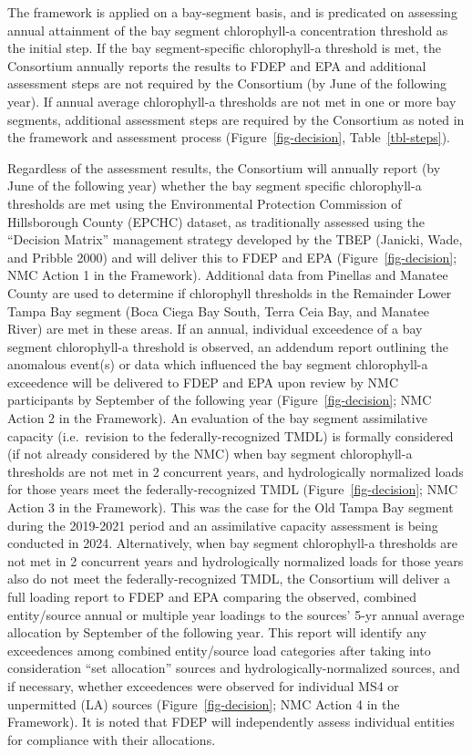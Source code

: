 \documentclass[
  letterpaper,
  DIV=11,
  numbers=noendperiod]{scrreport}
\begin{document}
The framework is applied on a bay-segment basis, and is predicated on
assessing annual attainment of the bay segment chlorophyll-a
concentration threshold as the initial step. If the bay segment-specific
chlorophyll-a threshold is met, the Consortium annually reports the
results to FDEP and EPA and additional assessment steps are not required
by the Consortium (by June of the following year). If annual average
chlorophyll-a thresholds are not met in one or more bay segments,
additional assessment steps are required by the Consortium as noted in
the framework and assessment process (Figure~\ref{fig-decision},
Table~\ref{tbl-steps}).

Regardless of the assessment results, the Consortium will annually
report (by June of the following year) whether the bay segment specific
chlorophyll-a thresholds are met using the Environmental Protection
Commission of Hillsborough County (EPCHC) dataset, as traditionally
assessed using the ``Decision Matrix'' management strategy developed by
the TBEP (Janicki, Wade, and Pribble 2000) and will deliver this to FDEP
and EPA (Figure~\ref{fig-decision}; NMC Action 1 in the Framework).
Additional data from Pinellas and Manatee County are used to determine
if chlorophyll thresholds in the Remainder Lower Tampa Bay segment (Boca
Ciega Bay South, Terra Ceia Bay, and Manatee River) are met in these
areas. If an annual, individual exceedence of a bay segment
chlorophyll-a threshold is observed, an addendum report outlining the
anomalous event(s) or data which influenced the bay segment
chlorophyll-a exceedence will be delivered to FDEP and EPA upon review
by NMC participants by September of the following year
(Figure~\ref{fig-decision}; NMC Action 2 in the Framework). An
evaluation of the bay segment assimilative capacity (i.e.~revision to
the federally-recognized TMDL) is formally considered (if not already
considered by the NMC) when bay segment chlorophyll-a thresholds are not
met in 2 concurrent years, and hydrologically normalized loads for those
years meet the federally-recognized TMDL (Figure~\ref{fig-decision}; NMC
Action 3 in the Framework). This was the case for the Old Tampa Bay
segment during the 2019-2021 period and an assimilative capacity
assessment is being conducted in 2024. Alternatively, when bay segment
chlorophyll-a thresholds are not met in 2 concurrent years and
hydrologically normalized loads for those years also do not meet the
federally-recognized TMDL, the Consortium will deliver a full loading
report to FDEP and EPA comparing the observed, combined entity/source
annual or multiple year loadings to the sources' 5-yr annual average
allocation by September of the following year. This report will identify
any exceedences among combined entity/source load categories after
taking into consideration ``set allocation'' sources and
hydrologically-normalized sources, and if necessary, whether exceedences
were observed for individual MS4 or unpermitted (LA) sources
(Figure~\ref{fig-decision}; NMC Action 4 in the Framework). It is noted
that FDEP will independently assess individual entities for compliance
with their allocations.
\end{document}
